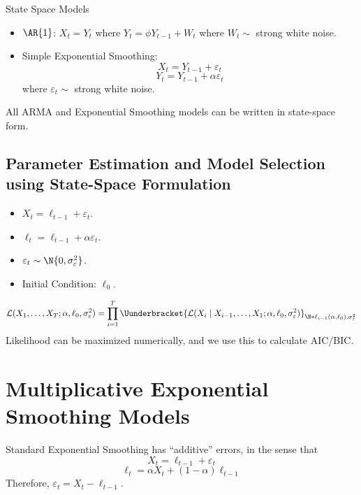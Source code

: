 \begin{Example}{State Space Models}{}
    \begin{itemize}
        \item $ \AR{1} $: $ X_t=Y_t $ where $ Y_t=\phi Y_{t-1}+W_t $
              where $ W_t \sim  $ strong white noise.
        \item Simple Exponential Smoothing:
              \[ X_t=Y_{t-1}+\varepsilon_t \]
              \[ Y_t=Y_{t-1}+\alpha \varepsilon_t \]
              where $ \varepsilon_t \sim  $ strong white noise.
    \end{itemize}
    All ARMA and Exponential Smoothing models can be written in state-space form.
\end{Example}
\subsection*{Parameter Estimation and Model Selection using State-Space Formulation}
\begin{itemize}
    \item $ X_t=\ell_{t-1}+\varepsilon_t $.
    \item $ \ell_t=\ell_{t-1}+\alpha\varepsilon_t $.
    \item $ \varepsilon_t \sim \N{0,\sigma_\varepsilon^2} $.
    \item Initial Condition: $ \ell_0 $.
\end{itemize}
\[ \mathcal{L}(X_1,\ldots,X_T;\alpha,\ell_0,\sigma_\varepsilon^2)=
    \prod_{i=1}^T \Uunderbracket{\mathcal{L}(X_i\mid X_{i-1},\ldots,X_1;\alpha,\ell_0,\sigma_\varepsilon^2)}_{
    \N*{\ell_{i-1}(\alpha,\ell_0),\sigma_\varepsilon^2}
    } \]
Likelihood can be maximized numerically, and we use this to calculate AIC/BIC\@.

\section{Multiplicative Exponential Smoothing Models}
Standard Exponential Smoothing has ``additive'' errors, in the sense that
\[ X_t=\ell_{t-1}+\varepsilon_t \]
\[ \ell_t=\alpha X_t+(1-\alpha)\ell_{t-1} \]
Therefore, $ \varepsilon_t=X_t-\ell_{t-1} $.

